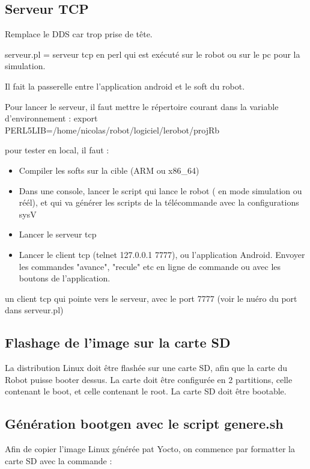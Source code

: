 \subsection{Serveur TCP}
Remplace le DDS car trop prise de tête.

serveur.pl = serveur tcp en perl qui est exécuté sur le robot ou sur le pc pour la simulation.


Il fait la passerelle entre l'application android et le soft du robot.

Pour lancer le serveur, il faut mettre le répertoire courant dans la variable d'environnement : export PERL5LIB=/home/nicolas/robot/logiciel/lerobot/projRb
  
pour tester en local, il faut : 


\begin{itemize}

\item Compiler les softs sur la cible (ARM ou x86\_64)

\item Dans une console, lancer le script qui lance le robot ( en mode simulation ou réél), et qui va générer les scripts de la télécommande avec la configurations sysV

\item Lancer le serveur tcp

\item Lancer le client tcp (telnet 127.0.0.1 7777), ou l'application Android. Envoyer les commandes "avance", "recule" etc en ligne de commande ou avec les boutons de l'application.


\end{itemize}



un client tcp qui pointe vers le serveur, avec le port 7777 (voir le nuéro du port dans serveur.pl)


\subsection{Flashage de l’image sur la carte SD}

La distribution Linux doit être flashée sur une carte SD, afin que la carte du Robot puisse booter dessus.
La carte doit être configurée en 2 partitions, celle contenant le boot, et celle contenant le root.
La carte SD doit être bootable.

\subsection{Génération bootgen avec le script genere.sh}
Afin de copier l'image Linux générée pat Yocto, on commence par formatter la carte SD avec la commande : 

